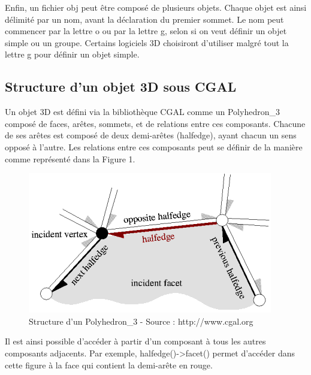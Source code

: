 \documentclass[a4paper,french]{report}
\begin{document}
				Enfin, un fichier obj peut être composé de plusieurs objets. Chaque objet est ainsi délimité par un nom, avant la déclaration du premier sommet. Le nom peut commencer par la lettre o ou par la lettre g, selon si on veut définir un objet simple ou un groupe. Certains logiciels 3D choisiront d'utiliser malgré tout la lettre g pour définir un objet simple.
				
			\subsection{Structure d'un objet 3D sous CGAL}
				Un objet 3D est défini via la bibliothèque CGAL comme un Polyhedron\_3 composé de faces, arêtes, sommets, et de relations entre ces composants. Chacune de ses arêtes est composé de deux demi-arêtes (halfedge), ayant chacun un sens opposé à l'autre. Les relations entre ces composants peut se définir de la manière comme représenté dans la Figure 1. \par
				\begin{figure}[h]
					\centering
					\includegraphics{halfedge_small.png}
					\caption{Structure d'un Polyhedron\_3 - Source : http://www.cgal.org}
				\end{figure}
				Il est ainsi possible d'accéder à partir d'un composant à tous les autres composants adjacents. Par exemple, halfedge()-\textgreater facet() permet d'accéder dans cette figure à la face qui contient la demi-arête en rouge.
				
\end{document}
